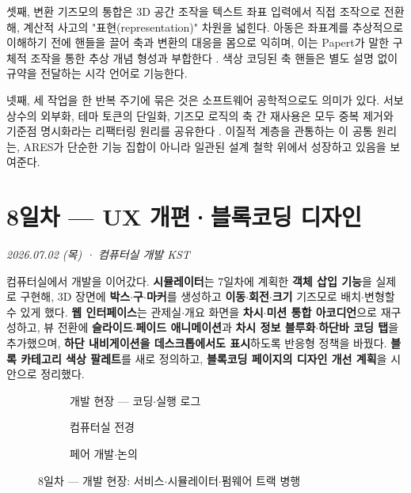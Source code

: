 셋째, 변환 기즈모의 통합은 3D 공간 조작을 텍스트 좌표 입력에서 직접 조작으로 전환해, 계산적 사고의 "표현(representation)" 차원을 넓힌다. 아동은 좌표계를 추상적으로 이해하기 전에 핸들을 끌어 축과 변환의 대응을 몸으로 익히며, 이는 Papert가 말한 구체적 조작을 통한 추상 개념 형성과 부합한다 \cite{papert1980}. 색상 코딩된 축 핸들은 별도 설명 없이 규약을 전달하는 시각 언어로 기능한다.

넷째, 세 작업을 한 반복 주기에 묶은 것은 소프트웨어 공학적으로도 의미가 있다. 서보 상수의 외부화, 테마 토큰의 단일화, 기즈모 로직의 축 간 재사용은 모두 중복 제거와 기준점 명시화라는 리팩터링 원리를 공유한다 \cite{fowler2018refactoring, mcconnell2004codecomplete}. 이질적 계층을 관통하는 이 공통 원리는, ARES가 단순한 기능 집합이 아니라 일관된 설계 철학 위에서 성장하고 있음을 보여준다.

\chapter{8일차 — UX 개편·블록코딩 디자인}
\textit{2026.07.02 (목) · 컴퓨터실 개발 KST}

\begin{summarybox}
컴퓨터실에서 개발을 이어갔다. \textbf{시뮬레이터}는 7일차에 계획한 \textbf{객체 삽입 기능}을
실제로 구현해, 3D 장면에 \textbf{박스$\cdot$구$\cdot$마커}를 생성하고 \textbf{이동$\cdot$회전$\cdot$크기}
기즈모로 배치$\cdot$변형할 수 있게 했다. \textbf{웹 인터페이스}는 관제실$\cdot$개요 화면을
\textbf{차시$\cdot$미션 통합 아코디언}으로 재구성하고, 뷰 전환에 \textbf{슬라이드$\cdot$페이드
애니메이션}과 \textbf{차시 정보 블루화}$\cdot$\textbf{하단바 코딩 탭}을 추가했으며,
\textbf{하단 내비게이션을 데스크톱에서도 표시}하도록 반응형 정책을 바꿨다.
\textbf{블록 카테고리 색상 팔레트}를 새로 정의하고, \textbf{블록코딩 페이지의 디자인 개선 계획}을
시안으로 정리했다.
\end{summarybox}

\begin{figure}[htbp]\centering
  \begin{subfigure}{0.32\linewidth}\centering
    \caption{개발 현장 — 코딩$\cdot$실행 로그}
  \end{subfigure}\hfill
  \begin{subfigure}{0.32\linewidth}\centering
    \caption{컴퓨터실 전경}
  \end{subfigure}\hfill
  \begin{subfigure}{0.32\linewidth}\centering
    \caption{페어 개발$\cdot$논의}
  \end{subfigure}
  \caption{8일차 — 개발 현장: 서비스$\cdot$시뮬레이터$\cdot$펌웨어 트랙 병행}
\end{figure}

